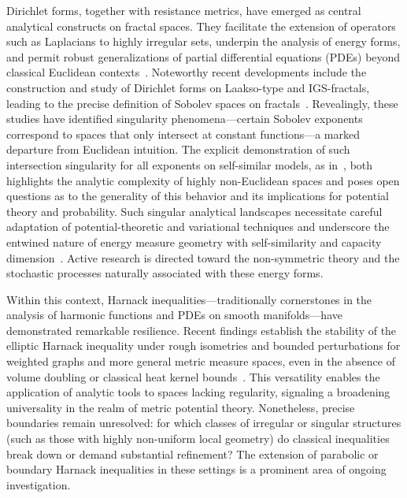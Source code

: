 \documentclass[sigconf]{acmart}
\begin{document}
Dirichlet forms, together with resistance metrics, have emerged as central analytical constructs on fractal spaces. They facilitate the extension of operators such as Laplacians to highly irregular sets, underpin the analysis of energy forms, and permit robust generalizations of partial differential equations (PDEs) beyond classical Euclidean contexts~\cite{ref43,ref51,ref40}. Noteworthy recent developments include the construction and study of Dirichlet forms on Laakso-type and IGS-fractals, leading to the precise definition of Sobolev spaces on fractals~\cite{ref13}. Revealingly, these studies have identified singularity phenomena---certain Sobolev exponents correspond to spaces that only intersect at constant functions---a marked departure from Euclidean intuition. The explicit demonstration of such intersection singularity for all exponents on self-similar models, as in~\cite{ref13}, both highlights the analytic complexity of highly non-Euclidean spaces and poses open questions as to the generality of this behavior and its implications for potential theory and probability. Such singular analytical landscapes necessitate careful adaptation of potential-theoretic and variational techniques and underscore the entwined nature of energy measure geometry with self-similarity and capacity dimension~\cite{ref43,ref40}. Active research is directed toward the non-symmetric theory and the stochastic processes naturally associated with these energy forms.

Within this context, Harnack inequalities---traditionally cornerstones in the analysis of harmonic functions and PDEs on smooth manifolds---have demonstrated remarkable resilience. Recent findings establish the stability of the elliptic Harnack inequality under rough isometries and bounded perturbations for weighted graphs and more general metric measure spaces, even in the absence of volume doubling or classical heat kernel bounds~\cite{ref38,ref40}. This versatility enables the application of analytic tools to spaces lacking regularity, signaling a broadening universality in the realm of metric potential theory. Nonetheless, precise boundaries remain unresolved: for which classes of irregular or singular structures (such as those with highly non-uniform local geometry) do classical inequalities break down or demand substantial refinement? The extension of parabolic or boundary Harnack inequalities in these settings is a prominent area of ongoing investigation.
\end{document}
